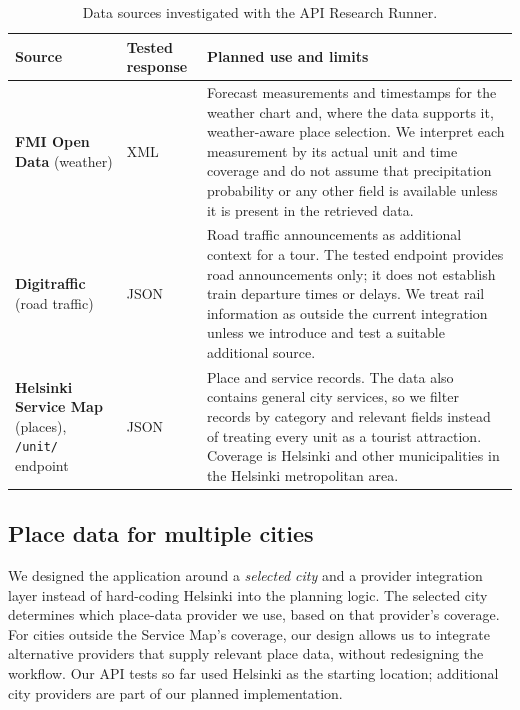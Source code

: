 \documentclass[a4paper,10pt]{article}
\begin{document}
\begin{table}[tbp]
\centering
\small
\caption{Data sources investigated with the API Research Runner.}
\label{tab:sources}
\begin{tabularx}{\linewidth}{@{}Y{2.5cm}Y{2.35cm}L@{}}
\toprule
{}\textbf{Source} & \textbf{Tested response} & \textbf{Planned use and limits} \\
\midrule
\textbf{FMI Open Data} (weather) & XML &
  Forecast measurements and timestamps for the weather chart and, where the data supports it, weather-aware place selection. We interpret each measurement by its actual unit and time coverage and do not assume that precipitation probability or any other field is available unless it is present in the retrieved data. \\
\textbf{Digitraffic} (road traffic) & JSON &
  Road traffic announcements as additional context for a tour. The tested endpoint provides road announcements only; it does not establish train departure times or delays. We treat rail information as outside the current integration unless we introduce and test a suitable additional source. \\
\textbf{Helsinki Service Map}\,\cite{servicemap,dataset} (places), \texttt{/unit/} endpoint & JSON &
  Place and service records. The data also contains general city services, so we filter records by category and relevant fields instead of treating every unit as a tourist attraction. Coverage is Helsinki and other municipalities in the Helsinki metropolitan area. \\
\bottomrule
\end{tabularx}
\end{table}

\subsection{Place data for multiple cities}\label{sec:multicity}
We designed the application around a \emph{selected city} and a provider integration layer instead of hard-coding Helsinki into the planning logic. The selected city determines which place-data provider we use, based on that provider's coverage. For cities outside the Service Map's coverage, our design allows us to integrate alternative providers that supply relevant place data, without redesigning the workflow. Our API tests so far used Helsinki as the starting location; additional city providers are part of our planned implementation.
\end{document}
